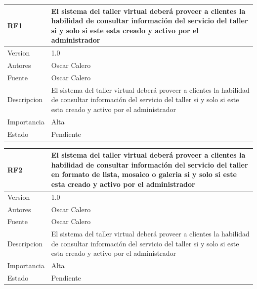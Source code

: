 \documentclass[10pt,a4paper,openany]{book}
\begin{document}
\begin{longtable}{|p{3cm}|p{3cm}|p{3cm}|p{3cm}|p{3cm}|} \hline	

RF1 & \multicolumn{4}{p{12cm}|}{El sistema del taller virtual deberá proveer a clientes la habilidad de consultar información del servicio del taller si y solo si este esta creado y activo por el administrador} \\ \hline	
Version     & \multicolumn{4}{p{12cm}|}{1.0} \\ \hline	
Autores & \multicolumn{4}{p{12cm}|}{Oscar Calero} \\ \hline	
Fuente                & \multicolumn{4}{p{12cm}|}{Oscar Calero} \\ \hline	
Descripcion         & \multicolumn{4}{p{12cm}|}{El sistema del taller virtual deberá proveer a clientes la habilidad de consultar información del servicio del taller si y solo si este esta creado y activo por el administrador} \\ \hline	
Importancia                 & \multicolumn{4}{p{12cm}|}{Alta} \\ \hline	
Estado        & \multicolumn{4}{p{12cm}|}{Pendiente} \\ \hline	
\end{longtable}	


\begin{longtable}{|p{3cm}|p{3cm}|p{3cm}|p{3cm}|p{3cm}|} \hline	

RF2 & \multicolumn{4}{p{12cm}|}{El sistema del taller virtual deberá proveer a clientes la habilidad de consultar información del servicio  del taller en formato de lista, mosaico o galeria si y solo si este esta creado y activo por el administrador} \\ \hline	
Version     & \multicolumn{4}{p{12cm}|}{1.0} \\ \hline	
Autores & \multicolumn{4}{p{12cm}|}{Oscar Calero} \\ \hline	
Fuente                & \multicolumn{4}{p{12cm}|}{Oscar Calero} \\ \hline	
Descripcion         & \multicolumn{4}{p{12cm}|}{El sistema del taller virtual deberá proveer a clientes la habilidad de consultar información del servicio del taller si y solo si este esta creado y activo por el administrador} \\ \hline	
Importancia                 & \multicolumn{4}{p{12cm}|}{Alta} \\ \hline	
Estado        & \multicolumn{4}{p{12cm}|}{Pendiente} \\ \hline	
\end{longtable}	
\end{document}
